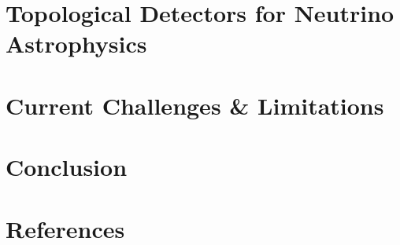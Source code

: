 \documentclass[%
 aapm,
 mph,%
 amsmath,amssymb,
 reprint,%
]{revtex4-2}
\begin{document}



\section{\label{sec:topological-detectors} Topological Detectors for Neutrino Astrophysics}





\section{\label{sec:current-challenges}Current Challenges \& Limitations}

\vspace{1em}



\section{Conclusion}
\vspace{1em}



\section*{References}

\end{document}
